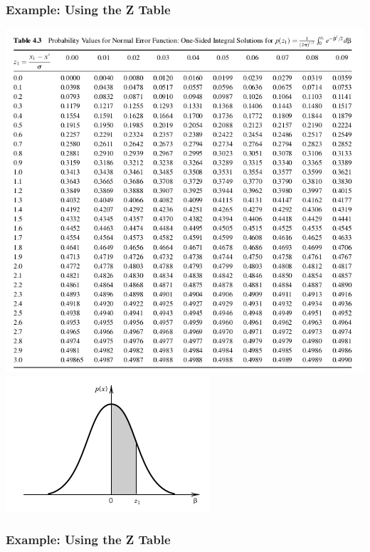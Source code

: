 \documentclass[fleqn]{beamer} %
\newcommand{\sectionIIsubsectionIVtitle}{Example: Using the Z Table}
\begin{document}
			\begin{frame}
				\frametitle{\sectionIIsubsectionIVtitle}

		\includegraphics[scale=.25]{images/topic2_fig2.png}	
		\includegraphics[scale=.45]{images/topic2_fig3.png}


			\end{frame}

			\begin{frame}
				\frametitle{\sectionIIsubsectionIVtitle}



			\end{frame}

			\begin{frame}



			\end{frame}
\end{document}
